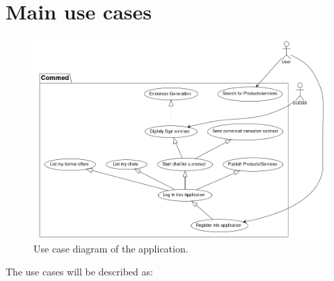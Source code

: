 \documentclass[./main.tex]{subfiles}
\begin{document}
\section{Main use cases}

\begin{figure}[H]
\centering
\includegraphics[width=\linewidth]{use_case_diagram/usecase_diagram.png} %
\caption{Use case diagram of the application.}
\end{figure}

The use cases will be described as:
\end{document}
